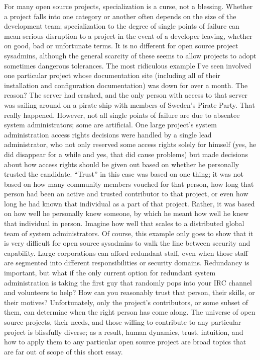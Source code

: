 For many open source projects, specialization is a curse, not a blessing. Whether a project falls into one category or another often depends on the size of the development team; specialization to the degree of single points of failure can mean serious disruption to a project in the event of a developer leaving, whether on good, bad or unfortunate terms. It is no different for open source project sysadmins, although the general scarcity of these seems to allow projects to adopt sometimes dangerous tolerances.
The most ridiculous example I’ve seen involved one particular project whose documentation site (including all of their installation and configuration documentation) was down for over a month. The reason? The server had crashed, and the only person with access to that server was sailing around on a pirate ship with members of Sweden’s Pirate Party. That really happened.
However, not all single points of failure are due to absentee system administrators; some are artificial. One large project’s system administration access rights decisions were handled by a single lead administrator, who not only reserved some access rights solely for himself (yes, he did disappear for a while and yes, that did cause problems) but made decisions about how access rights should be given out based on whether he personally trusted the candidate. “Trust” in this case was based on one thing; it was not based on how many community members vouched for that person, how long that person had been an active and trusted contributor to that project, or even how long he had known that individual as a part of that project. Rather, it was based on how well he personally knew someone, by which he meant how well he knew that individual in person. Imagine how well that scales to a distributed global team of system administrators.
Of course, this example only goes to show that it is very difficult for open source sysadmins to walk the line between security and capability. Large corporations can afford redundant staff, even when those staff are segmented into different responsibilities or security domains. Redundancy is important, but what if the only current option for redundant system administration is taking the first guy that randomly pops into your IRC channel and volunteers to help? How can you reasonably trust that person, their skills, or their motives?
Unfortunately, only the project’s contributors, or some subset of them, can determine when the right person has come along. The universe of open source projects, their needs, and those willing to contribute to any particular project is blissfully diverse; as a result, human dynamics, trust, intuition, and how to apply them to any particular open source project are broad topics that are far out of scope of this short essay.

